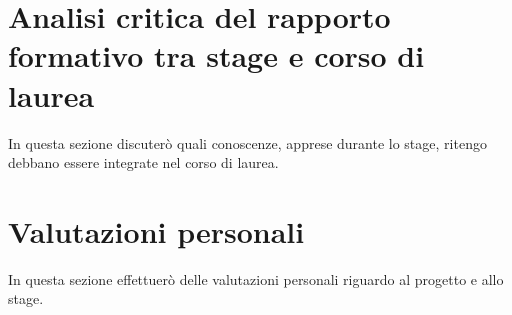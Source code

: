 \section{Analisi critica del rapporto formativo tra stage e corso di laurea}

In questa sezione discuterò quali conoscenze, apprese durante lo stage, ritengo debbano essere integrate nel corso di laurea.

\section{Valutazioni personali}

In questa sezione effettuerò delle valutazioni personali riguardo al progetto e allo stage.